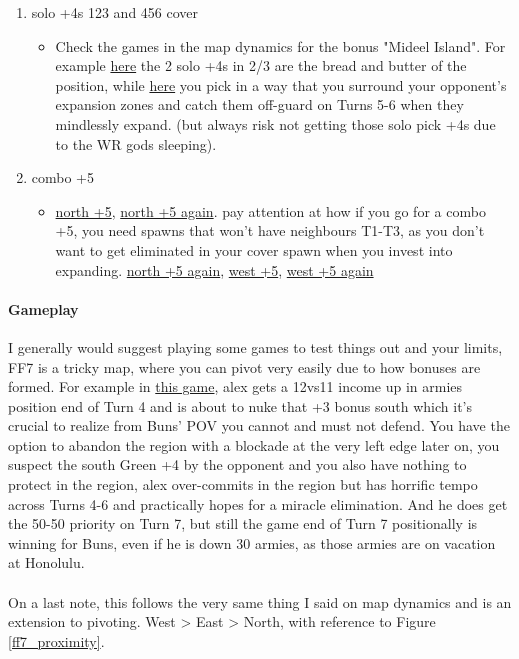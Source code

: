 \begin{enumerate}
\begin{itemize}
    \end{itemize}
    \item solo +4s 123 and 456 cover
    \begin{itemize}
        \item Check the games in the map dynamics for the bonus "Mideel Island". For example \href{https://www.warzone.com/MultiPlayer?GameID=38755207}{here} the 2 solo +4s in 2/3 are the bread and butter of the position, while \href{https://www.warzone.com/MultiPlayer?GameID=29556052}{here} you pick in a way that you surround your opponent's expansion zones and catch them off-guard on Turns 5-6 when they mindlessly expand. (but always risk not getting those solo pick +4s due to the WR gods sleeping).
    \end{itemize}
    \item combo +5
    \begin{itemize}
        \item \href{https://www.warzone.com/MultiPlayer?GameID=37386828}{north +5}, \href{https://www.warzone.com/MultiPlayer?GameID=34604299}{north +5 again}. pay attention at how if you go for a combo +5, you need spawns that won't have neighbours T1-T3, as you don't want to get eliminated in your cover spawn when you invest into expanding. \href{https://www.warzone.com/MultiPlayer?GameID=34553678}{north +5 again}, \href{https://www.warzone.com/MultiPlayer?GameID=33361193}{west +5}, \href{https://www.warzone.com/MultiPlayer?GameID=32562403}{west +5 again}
    \end{itemize}
\end{enumerate}

\paragraph{Gameplay}

I generally would suggest playing some games to test things out and your limits, FF7 is a tricky map, where you can pivot very easily due to how bonuses are formed. For example in \href{https://www.warzone.com/MultiPlayer?GameID=32756346}{this game}, alex gets a 12vs11 income up in armies position end of Turn 4 and is about to nuke that +3 bonus south which it's crucial to realize from Buns' POV you cannot and must not defend. You have the option to abandon the region with a blockade at the very left edge later on, you suspect the south Green +4 by the opponent and you also have nothing to protect in the region, alex over-commits in the region but has horrific tempo across Turns 4-6 and practically hopes for a miracle elimination. And he does get the 50-50 priority on Turn 7, but still the game end of Turn 7 positionally is winning for Buns, even if he is down 30 armies, as those armies are on vacation at Honolulu.
\\
\\
On a last note, this follows the very same thing I said on map dynamics and is an extension to pivoting. West > East > North, with reference to Figure \ref{ff7_proximity}.

